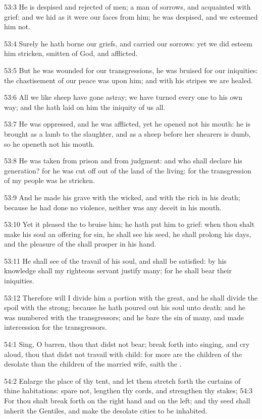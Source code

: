 53:3 He is despised and rejected of men; a man of sorrows, and acquainted with grief: and we hid as it were our faces from him; he was despised, and we esteemed him not.

53:4 Surely he hath borne our griefs, and carried our sorrows: yet we did esteem him stricken, smitten of God, and afflicted.

53:5 But he was wounded for our transgressions, he was bruised for our iniquities: the chastisement of our peace was upon him; and with his stripes we are healed.

53:6 All we like sheep have gone astray; we have turned every one to his own way; and the \LORD hath laid on him the iniquity of us all.

53:7 He was oppressed, and he was afflicted, yet he opened not his mouth: he is brought as a lamb to the slaughter, and as a sheep before her shearers is dumb, so he openeth not his mouth.

53:8 He was taken from prison and from judgment: and who shall declare his generation? for he was cut off out of the land of the living: for the transgression of my people was he stricken.

53:9 And he made his grave with the wicked, and with the rich in his death; because he had done no violence, neither was any deceit in his mouth.

53:10 Yet it pleased the \LORD to bruise him; he hath put him to grief: when thou shalt make his soul an offering for sin, he shall see his seed, he shall prolong his days, and the pleasure of the \LORD shall prosper in his hand.

53:11 He shall see of the travail of his soul, and shall be satisfied: by his knowledge shall my righteous servant justify many; for he shall bear their iniquities.

53:12 Therefore will I divide him a portion with the great, and he shall divide the spoil with the strong; because he hath poured out his soul unto death: and he was numbered with the transgressors; and he bare the sin of many, and made intercession for the transgressors.

54:1 Sing, O barren, thou that didst not bear; break forth into singing, and cry aloud, thou that didst not travail with child: for more are the children of the desolate than the children of the married wife, saith the \LORD.

54:2 Enlarge the place of thy tent, and let them stretch forth the curtains of thine habitations: spare not, lengthen thy cords, and strengthen thy stakes; 54:3 For thou shalt break forth on the right hand and on the left; and thy seed shall inherit the Gentiles, and make the desolate cities to be inhabited.

